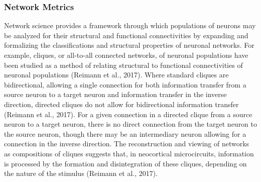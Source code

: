 \documentclass[11pt,titlepage]{article}
\begin{document}
\subsubsection{Network Metrics}\label{sssec:NM}
Network science provides a framework through which populations of neurons may be analyzed for their structural and functional connectivities by expanding and formalizing the classifications and structural properties of neuronal networks. For example, cliques, or all-to-all connected networks, of neuronal populations have been studied as a method of relating structural to functional connectivities of neuronal populations (Reimann et al., 2017). Where standard cliques are bidirectional, allowing a single connection for both information transfer from a source neuron to a target neuron and information transfer in the inverse direction, directed cliques do not allow for bidirectional information transfer (Reimann et al., 2017). For a given connection in a directed clique from a source neuron to a target neuron, there is no direct connection from the target neuron to the source neuron, though there may be an intermediary neuron allowing for a connection in the inverse direction. The reconstruction and viewing of networks as compositions of cliques suggests that, in neocortical microcircuits, information is processed by the formation and disintegration of these cliques, depending on the nature of the stimulus (Reimann et al., 2017).\par
\end{document}
